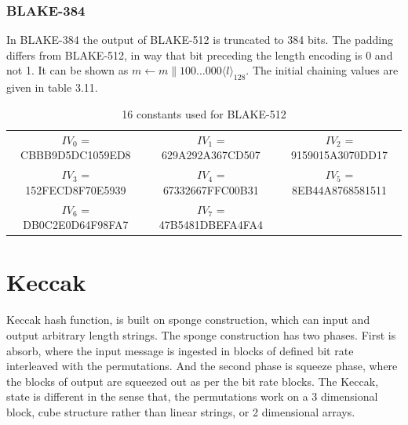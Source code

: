   \subsubsection{BLAKE-384}
  In BLAKE-384 the output of BLAKE-512 is truncated to 384 bits. The padding differs from BLAKE-512, in way that bit
  preceding the length encoding is 0 and not 1. It can be shown as $m \gets m \parallel 100 \dots 000 \langle l \rangle_{128}$. The
  initial chaining values are given in table 3.11.
  \begin{table}[h]
    \begin{center}
      \begin{tabular}{ *{3}{c}}
        $IV_{0}$  = CBBB9D5DC1059ED8 & $IV_{1}$  = 629A292A367CD507 & $IV_{2}$  = 9159015A3070DD17 \\
        $IV_{3}$  = 152FECD8F70E5939 & $IV_{4}$  = 67332667FFC00B31 & $IV_{5}$  = 8EB44A8768581511 \\
        $IV_{6}$  = DB0C2E0D64F98FA7 & $IV_{7}$  = 47B5481DBEFA4FA4 &                             \\
      \end{tabular}
      \caption{16 constants used for BLAKE-512}
    \end{center}
  \end{table}

\newpage

\section{Keccak}
Keccak hash function, is built on sponge construction, which can input and output arbitrary length strings. The sponge
construction has two phases. First is absorb, where the input message is ingested in blocks of defined bit rate interleaved
with the permutations. And the second phase is squeeze phase, where the blocks of output are squeezed out as per the 
bit rate blocks. The Keccak, state is different in the sense that, the permutations work on a 3 dimensional block, cube
structure rather than linear strings, or 2 dimensional arrays.

